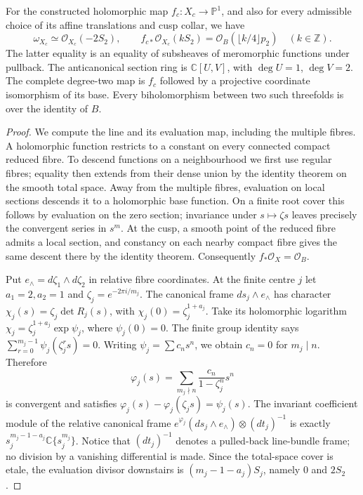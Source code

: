 \begin{proposition}\label{fam:src:A.1.1}\label{fam:st:A.1.1}
For the constructed holomorphic map $f_c:X_c\to\mathbb P^1$, and also for every admissible choice of its affine translations and cusp collar, we have
\[
 \omega_{X_c}\simeq\mathcal O_{X_c}(-2S_2),\qquad
 f_{c*}\mathcal O_{X_c}(kS_2)=\mathcal O_B(\lfloor k/4\rfloor p_2)\quad(k\in\mathbb Z).
\]
The latter equality is an equality of subsheaves of meromorphic functions under pullback. The anticanonical section ring is $\mathbb C[U,V]$, with $\deg U=1$, $\deg V=2$. The complete degree-two map is $f_c$ followed by a projective coordinate isomorphism of its base. Every biholomorphism between two such threefolds is over the identity of $B$.
\end{proposition}
\begin{proof}
We compute the line and its evaluation map, including the multiple fibres. A holomorphic function restricts to a constant on every connected compact reduced fibre. To descend functions on a neighbourhood we first use regular fibres; equality then extends from their dense union by the identity theorem on the smooth total space. Away from the multiple fibres, evaluation on local sections descends it to a holomorphic base function. On a finite root cover this follows by evaluation on the zero section; invariance under $s\mapsto\zeta s$ leaves precisely the convergent series in $s^m$. At the cusp, a smooth point of the reduced fibre admits a local section, and constancy on each nearby compact fibre gives the same descent there by the identity theorem. Consequently $f_*\mathcal O_X=\mathcal O_B$.

Put $e_\wedge=d\zeta_1\wedge d\zeta_2$ in relative fibre coordinates. At the finite centre $j$ let $a_1=2,a_2=1$ and $\zeta_j=e^{-2\pi i/m_j}$. The canonical frame $ds_j\wedge e_\wedge$ has character $\chi_j(s)=\zeta_j\det R_j(s)$, with $\chi_j(0)=\zeta_j^{1+a_j}$. Take its holomorphic logarithm $\chi_j=\zeta_j^{1+a_j}\exp\psi_j$, where $\psi_j(0)=0$. The finite group identity says $\sum_{r=0}^{m_j-1}\psi_j(\zeta_j^r s)=0$. Writing $\psi_j=\sum c_ns^n$, we obtain $c_n=0$ for $m_j\mid n$. Therefore
\[
 \varphi_j(s)=\sum_{m_j\nmid n}\frac{c_n}{1-\zeta_j^n}s^n
\]
is convergent and satisfies $\varphi_j(s)-\varphi_j(\zeta_js)=\psi_j(s)$. The invariant coefficient module of the relative canonical frame
$e^{\varphi_j}(ds_j\wedge e_\wedge)\otimes(dt_j)^{-1}$ is exactly
$s_j^{m_j-1-a_j}\mathbb C\{s_j^{m_j}\}$. Notice that $(dt_j)^{-1}$ denotes a pulled-back line-bundle frame; no division by a vanishing differential is made. Since the total-space cover is etale, the evaluation divisor downstairs is $(m_j-1-a_j)S_j$, namely $0$ and $2S_2$.


\end{proof}
